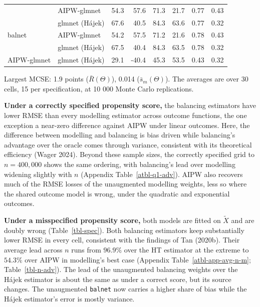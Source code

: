 \documentclass[
  12pt,
  a4paper,
]{article}
\begin{document}
\begin{table}[!htbp]
{\begin{tabular*}{\linewidth}{@{\extracolsep{\fill}}llrrrrrr}
 & AIPW-glmnet & 54.3 & 57.6 & 71.3 & 21.7 & 0.77 & 0.43 \\ 
 & glmnet (Hájek) & 67.6 & 40.5 & 84.3 & 63.6 & 0.77 & 0.32 \\ 
{balnet} & {AIPW-glmnet} & {54.2} & {57.5} & {71.2} & {21.6} & {0.78} & {0.43} \\ 
 & glmnet (Hájek) & 67.5 & 40.4 & 84.3 & 63.5 & 0.78 & 0.32 \\ 
{AIPW-glmnet} & {glmnet (Hájek)} & {29.1} & {-40.4} & {45.3} & {53.5} & {0.43} & {0.32} \\ 
\bottomrule
\end{tabular*}
\begin{minipage}{\linewidth}
\vspace{.05em}
Largest MCSE: 1.9 points (\(\bar R(\Theta)\)), 0.014 (\(\bar s_m(\Theta)\)). The averages are over 30 cells, 15 per specification, at 10 000 Monte Carlo replications.\\
\end{minipage}

}

\end{table}%

\textbf{Under a correctly specified propensity score,} the balancing
estimators have lower RMSE than every modelling estimator across outcome
functions, the one exception a near-zero difference against AIPW under
linear outcomes. Here, the difference between modelling and balancing is
bias driven while balancing's advantage over the oracle comes through
variance, consistent with its theoretical efficiency (Wager 2024).
Beyond these sample sizes, the correctly specified grid to
\(n = 400{,}000\) shows the same ordering, with balancing's lead over
modelling widening slightly with \(n\)
(Appendix Table~\ref{atbl-q1-adv}). AIPW also recovers much of the RMSE
losses of the unaugmented modelling weights, less so where the shared
outcome model is wrong, under the quadratic and exponential outcomes.

\textbf{Under a misspecified propensity score,} both models are fitted
on \(\tilde X\) and are doubly wrong (Table~\ref{tbl-spec}). Both
balancing estimators keep substantially lower RMSE in every cell,
consistent with the findings of Tan (2020b). Their average lead across
\(n\) runs from \(96.9\%\) over the HT estimator at the extreme to
\(54.3\%\) over AIPW in modelling's best case
(Appendix Table~\ref{atbl-app-avg-n-m}; Table~\ref{tbl-n-adv}). The lead
of the unaugmented balancing weights over the Hájek estimator is about
the same as under a correct score, but its source changes. The
unaugmented \texttt{balnet} now carries a higher share of bias while the
Hájek estimator's error is mostly variance.
\end{document}

